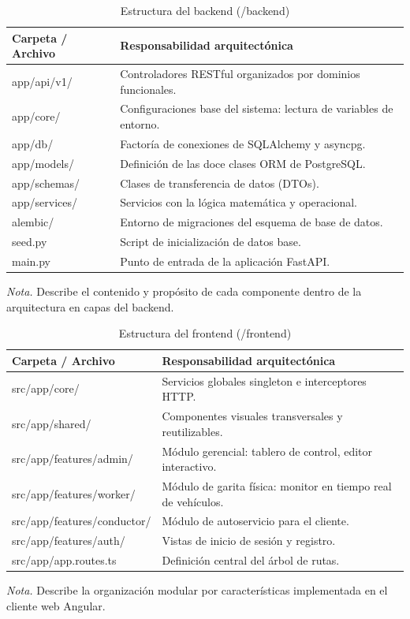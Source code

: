 \begin{table}[htbp]
\caption{Estructura del backend (/backend)}
\label{tab:backend_struct}
\begin{tabular}{@{}p{5cm} p{10cm}@{}}
\toprule
\textbf{Carpeta / Archivo} & \textbf{Responsabilidad arquitectónica} \\
\midrule
app/api/v1/ & Controladores RESTful organizados por dominios funcionales. \\
app/core/ & Configuraciones base del sistema: lectura de variables de entorno. \\
app/db/ & Factoría de conexiones de SQLAlchemy y asyncpg. \\
app/models/ & Definición de las doce clases ORM de PostgreSQL. \\
app/schemas/ & Clases de transferencia de datos (DTOs). \\
app/services/ & Servicios con la lógica matemática y operacional. \\
alembic/ & Entorno de migraciones del esquema de base de datos. \\
seed.py & Script de inicialización de datos base. \\
main.py & Punto de entrada de la aplicación FastAPI. \\
\bottomrule
\end{tabular}
\par\vspace{0.2cm}
\textit{Nota.} Describe el contenido y propósito de cada componente dentro de la arquitectura en capas del backend.
\end{table}

\begin{table}[htbp]
\caption{Estructura del frontend (/frontend)}
\label{tab:frontend_struct}
\begin{tabular}{@{}p{5cm} p{10cm}@{}}
\toprule
\textbf{Carpeta / Archivo} & \textbf{Responsabilidad arquitectónica} \\
\midrule
src/app/core/ & Servicios globales singleton e interceptores HTTP. \\
src/app/shared/ & Componentes visuales transversales y reutilizables. \\
src/app/features/admin/ & Módulo gerencial: tablero de control, editor interactivo. \\
src/app/features/worker/ & Módulo de garita física: monitor en tiempo real de vehículos. \\
src/app/features/conductor/ & Módulo de autoservicio para el cliente. \\
src/app/features/auth/ & Vistas de inicio de sesión y registro. \\
src/app/app.routes.ts & Definición central del árbol de rutas. \\
\bottomrule
\end{tabular}
\par\vspace{0.2cm}
\textit{Nota.} Describe la organización modular por características implementada en el cliente web Angular.
\end{table}

